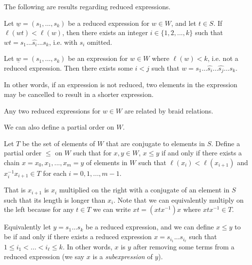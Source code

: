 \n
The following are results regarding reduced expressions.

\begin{theorem}
    Let $\underline{w} = (s_1, ..., s_k)$ be a reduced expression for $w \in W$, and let $t \in S$. If $\ell(wt) < \ell(w)$, then there exists an integer $i \in \{1,2,...,k\}$ such that $wt = s_1 ... \hat{s_i} ... s_k$, i.e. with $s_i$ omitted.
\end{theorem}


\begin{corollary}
    Let $\underline{w} = (s_1, ..., s_k)$ be an expression for $w \in W$ where $\ell(w) < k$, i.e. not a reduced expression. Then there exists some $i < j$ such that $w = s_1 ... \hat{s_i} ... \hat{s_j} ... s_k$.
\end{corollary}

In other words, if an expression is not reduced, two elements in the expression may be cancelled to result in a shorter expression.


\begin{theorem}[Matsumoto, 1964]\label{thm-matsumoto}
    Any two reduced expressions for $w \in W$ are related by braid relations.
\end{theorem}


We can also define a partial order on $W$.

\begin{definition}
    Let $T$ be the set of elements of $W$ that are conjugate to elements in $S$. Define a partial order $\leq$ on $W$ such that for $x,y \in W$, $x \leq y$ if and only if there exists a chain $x=x_0,x_1,...,x_m=y$ of elements in $W$ such that $\ell(x_i) < \ell(x_{i+1})$ and $x_i^{-1} x_{i+1} \in T$ for each $i = 0,1,...,m-1$.
\end{definition}

That is $x_{i+1}$ is $x_i$ multiplied on the right with a conjugate of an element in $S$ such that its length is longer than $x_i$. Note that we can equivalently multiply on the left because for any $t \in T$ we can write $xt = (xtx^{-1})x$ where $xtx^{-1} \in T$.


\n
Equivalently let $y = s_1 ... s_k$ be a reduced expression, and we can define $x \leq y$ to be if and only if there exists a reduced expression $x = s_{i_1} ... s_{i_\ell}$ such that $1 \leq i_1 < ... < i_\ell \leq k$. In other words, $x$ is $y$ after removing some terms from a reduced expression (we say $x$ is a \textit{subexpression} of $y$).

